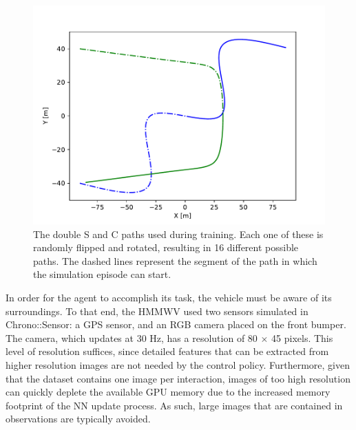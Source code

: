 \documentclass[12pt,twocolumn]{article}
\begin{document}

\begin{figure}
    \centering
    \includegraphics[width=\columnwidth]{Figs/base_paths.pdf} 
    \caption{The double S and C paths used during training. Each one of these is randomly flipped and rotated, resulting in 16 different possible paths. The dashed lines represent the segment of the path in which the simulation episode can start.}
    \label{fig:paths}
\end{figure}

In order for the agent to accomplish its task, the vehicle must be aware of its surroundings. To that end, the HMMWV used two sensors simulated in Chrono::Sensor: a GPS sensor, and an RGB camera placed on the front bumper. The camera, which updates at 30 Hz, has a resolution of 80 $\times$ 45 pixels. This level of resolution suffices, since detailed features that can be extracted from higher resolution images are not needed by the control policy. Furthermore, given that the dataset contains one image per interaction, images of too high resolution can quickly deplete the available GPU memory due to the increased memory footprint of the NN update process. As such, large images that are contained in observations are typically avoided. 
\end{document}
